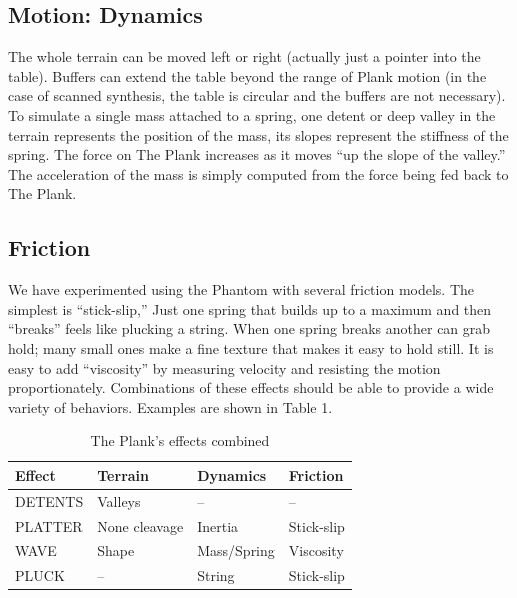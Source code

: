 \subsection{Motion: Dynamics}

The whole terrain can be moved left or right (actually just a pointer into the table). Buffers can extend the table beyond the range of Plank motion (in the case of scanned synthesis, the table is circular and the buffers are not necessary). To simulate a single mass attached to a spring, one detent or deep valley in the terrain represents the position of the mass, its slopes represent the stiffness of the spring. The force on The Plank increases as it moves ``up the slope of the valley.'' The acceleration of the mass is simply computed from the force being fed back to The Plank.

\subsection{Friction}

We have experimented using the Phantom with several friction models. The simplest is ``stick-slip,'' Just one spring that builds up to a maximum and then ``breaks'' feels like plucking a string. When one spring breaks another can grab hold; many small ones make a fine texture that makes it easy to hold still. It is easy to add ``viscosity'' by measuring velocity and resisting the motion proportionately.
Combinations of these effects should be able to provide a wide variety of behaviors. Examples are shown in Table 1.

\begin{table}
\label{Verplank:tab:1} 
\centering
{}
\caption{The Plank's effects combined}
\vspace{3pt} \noindent
\begin{tabular}{llll}
\toprule
\textbf{Effect} & \textbf{Terrain} & \textbf{Dynamics} & \textbf{Friction}  \\
\midrule  
DETENTS  & Valleys  \hspace{2cm}  & --   & --\\
PLATTER & None cleavage & Inertia \hspace{2cm} & Stick-slip\\
WAVE \hspace{2cm} & Shape  & Mass/Spring & Viscosity\\
PLUCK & --  & String & Stick-slip\\
\bottomrule
\end{tabular}
\end{table}

